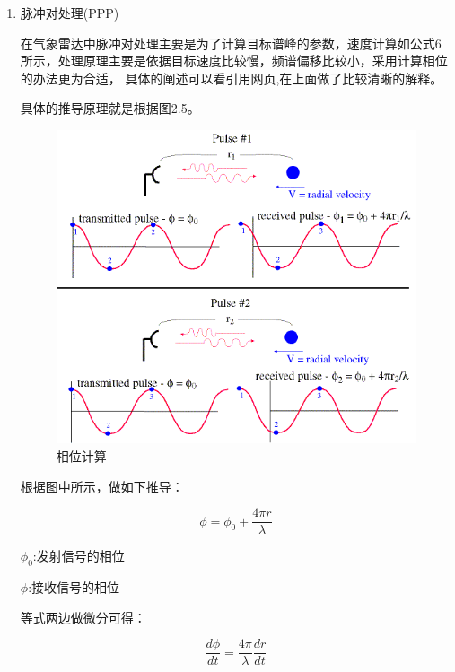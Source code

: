 \documentclass[a4paper,12pt]{report}
\begin{document}
\begin{spacing}{1.5}
\begin{enumerate}[1)]
    \item 脉冲对处理(PPP)\cite{FundamentalsOfRadarSignalProcessing}\cite{radarmeter}
    \cite{RadarManual}
    
    \qquad 在气象雷达中脉冲对处理主要是为了计算目标谱峰的参数，速度计算如公式6
    所示，处理原理主要是依据目标速度比较慢，频谱偏移比较小，采用计算相位的办法更为合适，
    具体的阐述可以看引用网页\cite{dopler.web},在上面做了比较清晰的解释。

    具体的推导原理就是根据图2.5。
    \begin{figure}[hbtp]
        \centering
        \includegraphics [width=1.0\textwidth]{figure//pulse.png}
        \caption{相位计算}\label{pulse}
    \end{figure}

    根据图中所示，做如下推导：

    \begin{proposition}[相位计算推导公式]
        
        \begin{equation}
            \phi = \phi_0 +　\frac{4\pi r}{\lambda}
        \end{equation}

        $\phi_0$:发射信号的相位

        $\phi$:接收信号的相位

        等式两边做微分可得：

        \begin{equation}
            \frac{d\phi}{dt}=\frac{4\pi}{\lambda}\frac{dr}{dt}
        \end{equation}


\end{proposition}
\end{enumerate}
\end{spacing}
\end{document}
